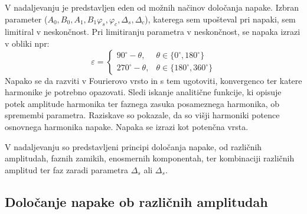 \documentclass[a4paper]{article}
\begin{document}
V nadaljevanju je predstavljen eden od možnih načinov določanja napake. Izbran parameter ($A_0, B_0, A_1, B_1 \varphi_{s}, \varphi_{c}, \Delta_s, \Delta_c$), katerega sem upošteval pri napaki, sem limitiral v neskončnost. Pri limitiranju parametra v neskončnost, se napaka izrazi v obliki npr:
\begin{equation}
\label{equ:def_err_inf}
\varepsilon=
\begin{cases}
90^\circ-\theta, & \theta \in \{0^\circ,180^\circ\}\\
270^\circ-\theta, & \theta \in \{180^\circ,360^\circ\}
\end{cases}
\end{equation}
Napako se da razviti v Fourierovo vrsto \cite{fourier} in s tem ugotoviti, konvergenco ter katere harmonike je potrebno opazovati. Sledi iskanje analitične funkcije, ki opisuje potek amplitude harmonika ter faznega zasuka posameznega harmonika, ob spremembi parametra. Raziskave so pokazale, da so višji harmoniki potence osnovnega harmonika napake. Napaka se izrazi kot potenčna vrsta.

V nadaljevanju so predstavljeni principi določanja napake, od različnih amplitudah, faznih zamikih, enosmernih komponentah, ter kombinaciji različnih amplitud ter faz zaradi parametra $\Delta_s$ ali $\Delta_s$.

\subsection{Določanje napake ob različnih amplitudah}
\end{document}
